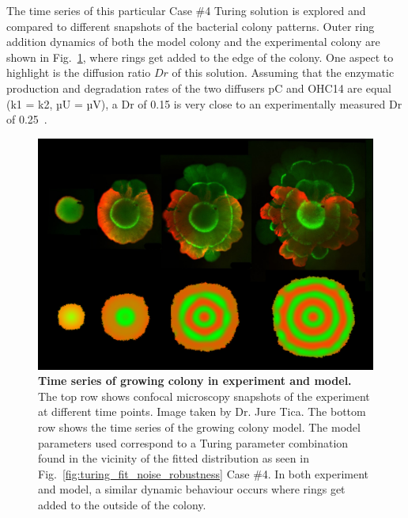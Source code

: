 The time series of this particular Case \#4 Turing solution is explored and compared to different snapshots of the bacterial colony patterns.
Outer ring addition dynamics of both the model colony and the experimental colony are shown in Fig.~\ref{fig:outer_ring_addition_modelvsexperiment}, where rings get added to the edge of the colony.
One aspect to highlight is the diffusion ratio $Dr$ of this solution.
Assuming that the enzymatic production and degradation rates of the two diffusers pC and OHC14 are equal (k1 = k2, µU = µV), a Dr of 0.15 is very close to an experimentally measured Dr of 0.25~\cite{tica_diffusers}.

\begin{figure}[H] %
    \centering
    \begin{adjustbox}{center}
        \includegraphics[width=1\textwidth]{chapters/Chapter 3/outer_ring_addition_modelvsexperiment} %
    \end{adjustbox}
    \caption{\textbf{Time series of growing colony in experiment and model.} The top row shows confocal microscopy snapshots of the experiment at different time points. Image taken by Dr. Jure Tica. The bottom row shows the time series of the growing colony model. The model parameters used correspond to a Turing parameter combination found in the vicinity of the fitted distribution as seen in Fig.~\ref{fig:turing_fit_noise_robustness} Case \#4. In both experiment and model, a similar dynamic behaviour occurs where rings get added to the outside of the colony.}
    \label{fig:outer_ring_addition_modelvsexperiment}
\end{figure}

